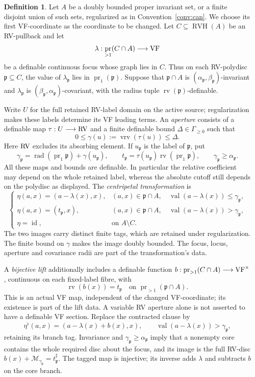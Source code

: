 \documentclass[12pt]{amsart}
\newcommand{\memph}[1]{{\color{magenta}\emph{#1}}}
\theoremstyle{plain}
\theoremstyle{definition}
\newtheorem{defn}[thm]{Definition}
\theoremstyle{remark}
\numberwithin{equation}{section}
\theoremstyle{plain}
\newcommand{\VF}{\textup{VF}}
\newcommand{\RV}{\textup{RV}}
\newcommand{\MM}{\mdl M}
\DeclareMathOperator{\id}{id}
\DeclareMathOperator{\pr}{pr}
\newcommand{\gp}{\mathfrak{p}}
\newcommand{\0}{\emptyset}
\newcommand{\mdl}[1]{\mathcal{#1}}  %
\DeclareMathOperator{\rv}{rv}
\DeclareMathOperator{\vv}{val}
\DeclareMathOperator{\rad}{rad}
\DeclareMathOperator{\vrv}{vrv}
\DeclareMathOperator{\RVH}{RVH}
\begin{document}
\begin{defn}\label{defn:special:bijection}
Let $A$ be a doubly bounded proper invariant set, or a finite disjoint
union of such sets, regularized as in Convention~\ref{conv:can}. We
choose its first VF-coordinate as the coordinate to be changed.
Let $C\subseteq\RVH(A)$ be an RV-pullback and let
\[
 \lambda:\pr_{>1}(C\cap A)\longrightarrow\VF
\]
be a definable continuous focus whose graph lies in $C$. Thus on each
RV-polydisc $\gp\subseteq C$, the value of $\lambda_\gp$ lies in
$\pr_1(\gp)$. Suppose that $\gp\cap A$ is
$(\alpha_\gp,\beta_\gp)$-invariant and $\lambda_\gp$ is
$(\beta_\gp,\alpha_\gp)$-covariant, with the radius tuple
$\rv(\gp)$-definable.

Write $U$ for the full retained RV-label domain on the active source;
regularization makes these labels determine its VF leading terms.
An \memph{aperture} consists of a definable map
$\tau:U\longrightarrow\RV$ and a finite definable bound
$\Delta\in\Gamma_{\geq0}$ such that
\[
 0\leq\gamma(u):=\vrv(\tau(u))\leq\Delta.
\]
Here $\RV$ excludes its absorbing element. If $u_\gp$ is the label of
$\gp$, put
\[
 \gamma_\gp=\rad(\pr_1\gp)+\gamma(u_\gp),\qquad
 t_\gp=\tau(u_\gp)\rv(\pr_1\gp),
 \qquad \gamma_\gp\geq\alpha_\gp.
\]
All these maps and bounds are definable. In particular the
relative coefficient may depend on the whole retained label, whereas
the absolute cutoff still depends on the polydisc as displayed.
The \memph{centripetal transformation} is
\begin{equation*}\tag{CT}\label{centri}
\begin{cases}
 \eta(a,x)=(a-\lambda(x),x),
 & (a,x)\in\gp\cap A,\quad\vv(a-\lambda(x))\leq\gamma_\gp,\\
 \eta(a,x)=(t_\gp,x),
 & (a,x)\in\gp\cap A,\quad\vv(a-\lambda(x))>\gamma_\gp,\\
 \eta=\id,&\text{on }A\setminus C.
\end{cases}
\end{equation*}
The two images carry distinct finite tags, which are retained under
regularization. The finite bound on $\gamma$ makes the image doubly
bounded. The focus, locus, aperture and covariance radii are part of
the transformation's data.

A \memph{bijective lift} additionally includes a definable function
$b:\pr_{>1}(C\cap A)\longrightarrow\VF^\times$, continuous on each
fixed-label fibre, with
\[
 \rv(b(x))=t_\gp\quad\text{on }\pr_{>1}(\gp\cap A).
\]
This is an actual VF map, independent of the changed VF-coordinate;
its existence is part of the lift data. A variable RV aperture alone
is not asserted to have a definable VF section. Replace the contracted
clause by
\[
 \eta^\flat(a,x)=(a-\lambda(x)+b(x),x),
 \qquad \vv(a-\lambda(x))>\gamma_\gp,
\]
retaining its branch tag. Invariance and
$\gamma_\gp\geq\alpha_\gp$ imply that a nonempty core contains the
whole required disc about the focus, and its image is the full RV-disc
$b(x)+\MM_{\gamma_\gp}=t_\gp^\sharp$. The tagged map is injective;
its inverse adds $\lambda$ and subtracts $b$ on the core branch.


\end{defn}
\end{document}
